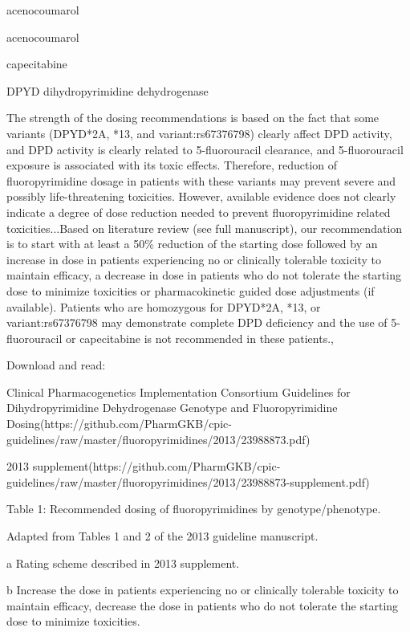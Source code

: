 \documentclass{resume} %
\begin{document}
\begin{rSection}{ acenocoumarol }
\begin{rSection}{ acenocoumarol }
\begin{rSection}{ capecitabine }
\begin{rSubsection}{ DPYD }{ dihydropyrimidine dehydrogenase }{}{}
\item The strength of the dosing recommendations is based on the fact that some variants (DPYD*2A, *13, and variant:rs67376798) clearly affect DPD activity, and DPD activity is clearly related to 5-fluorouracil clearance, and 5-fluorouracil exposure is associated with its toxic effects. Therefore, reduction of fluoropyrimidine dosage in patients with these variants may prevent severe and possibly life-threatening toxicities. However, available evidence does not clearly indicate a degree of dose reduction needed to prevent fluoropyrimidine related toxicities...Based on literature review (see full manuscript), our recommendation is to start with at least a 50\% reduction of the starting dose followed by an increase in dose in patients experiencing no or clinically tolerable toxicity to maintain efficacy, a decrease in dose in patients who do not tolerate the starting dose to minimize toxicities or pharmacokinetic guided dose adjustments (if available). Patients who are homozygous for DPYD*2A, *13, or variant:rs67376798 may demonstrate complete DPD deficiency and the use of 5-fluorouracil or capecitabine is not recommended in these patients.,  
 \newline
\item Download and read:
 \newline
\item Clinical Pharmacogenetics Implementation Consortium Guidelines for Dihydropyrimidine Dehydrogenase Genotype and Fluoropyrimidine Dosing(https://github.com/PharmGKB/cpic-guidelines/raw/master/fluoropyrimidines/2013/23988873.pdf)
 \newline
\item 2013 supplement(https://github.com/PharmGKB/cpic-guidelines/raw/master/fluoropyrimidines/2013/23988873-supplement.pdf)
 \newline
\item Table 1: Recommended dosing of fluoropyrimidines by genotype/phenotype.
 \newline
\item Adapted from Tables 1 and 2 of the 2013 guideline manuscript.
 \newline
\item a Rating scheme described in 2013 supplement.
 \newline
\item b Increase the dose in patients experiencing no or clinically tolerable toxicity to maintain efficacy,  decrease the dose in patients who do not tolerate the starting dose to minimize toxicities.

\end{rSubsection}
\end{rSection}
\end{rSection}
\end{rSection}
\end{document}
